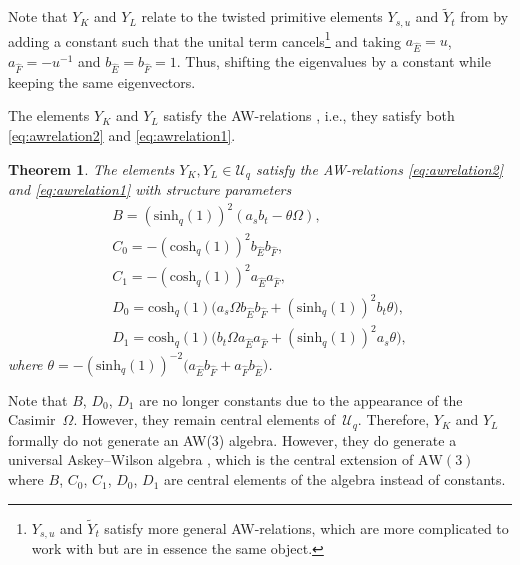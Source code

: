 \documentclass[10pt,a4paper]{amsart}
\numberwithin{equation}{section}
\newtheorem{Theorem}{Theorem}[section]
\newcommand{\aw}{\mathrm{AW}\!\left(3\right)}
\newcommand{\chq}{\mathrm{cosh}_q}
\newcommand{\shq}{\mathrm{sinh}_q}
\newcommand{\Uq}{\mathcal{U}_q}
\begin{document}
Note that $Y_K$ and $Y_L$ relate to the twisted primitive elements $Y_{s,u}$ and $\tilde{Y}_{t}$ from \cite{Groenevelt2021} by adding a constant such that the unital term cancels\footnote{$Y_{s,u}$ and $\tilde{Y}_{t}$ satisfy more general AW-relations, which are more complicated to work with but are in essence the same object.} and taking $a_{\hat{E}}=u$, $a_{\hat{F}}=-u^{-1}$ and $b_{\hat{E}}=b_{\hat{F}}=1$. Thus, shifting the eigenvalues by a constant while keeping the same eigenvectors.

The elements $Y_K$ and $Y_L$ satisfy the AW-relations \cite{Granovskii1993}, i.e., they satisfy both \eqref{eq:awrelation2} and \eqref{eq:awrelation1}.
\begin{Theorem}\label{thm:tpeaw3}
	The elements $Y_{K},Y_{L}\in\Uq$ satisfy the AW-relations \eqref{eq:awrelation2} and \eqref{eq:awrelation1} with structure parameters
	\begin{gather}
B= (\shq(1))^2 (a_s b_t- \theta\Omega ),\nonumber\\
C_0= - (\chq(1))^2 b_{\hat{E}} b_{\hat{F}},\nonumber\\
C_1= -(\chq(1))^2a_{\hat{E}}a_{\hat{F}},\nonumber\\
D_0 = \chq(1)\big( a_s\Omega b_{\hat{E}} b_{\hat{F}}+(\shq(1))^2b_t\theta\big),\nonumber\\
D_1 = \chq(1)\big( b_t\Omega a_{\hat{E}}a_{\hat{F}}+(\shq(1))^2a_s\theta\big),\label{eq:embeddingconstants}
\end{gather}
where $\theta=-(\shq(1))^{-2}\big(a_{\hat{E}}b_{\hat{F}} + a_{\hat{F}}b_{\hat{E}}\big)$.
\end{Theorem}

\begin{Remark}Note that $B$, $D_0$, $D_1$ are no longer constants due to the appearance of the Casimir~$\Omega$. However, they remain central elements of~$\Uq$. Therefore, $Y_K$ and $Y_L$ formally do not generate an AW(3) algebra. However, they do generate a universal Askey--Wilson algebra \cite{Terwilliger2011}, which is the central extension of $\aw$ where $B$, $C_0$, $C_1$, $D_0$, $D_1$ are central elements of the algebra instead of constants.
\end{Remark}
\end{document}
